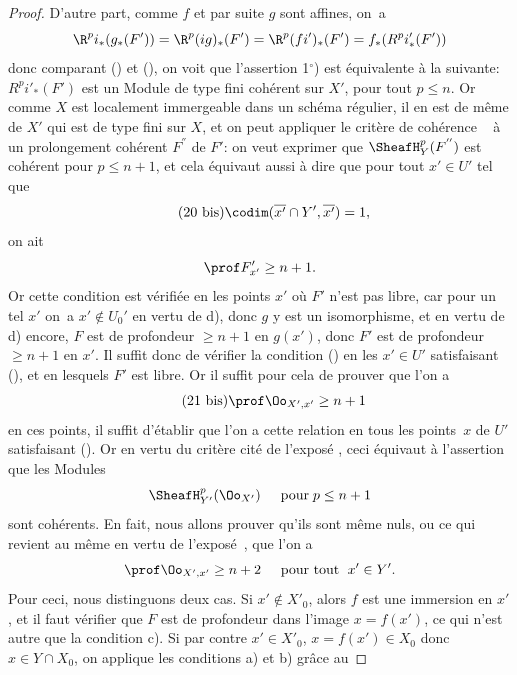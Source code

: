 \begin{proof}
D'autre part, comme $f$ et par suite $g$ sont affines, on~a
\steco
\begin{equation} \label{eq:XII.20} {}\R^pi_\ast(g_\ast(F')) = \R^p(ig)_\ast(F') = \R^p(fi')_\ast(F') = f_\ast(R^pi'_\ast(F'))
\end{equation}
donc comparant () et (), on voit que l'assertion 1${}^\circ$) est \'equivalente \`a la suivante: $R^pi'_\ast(F')$ est un Module de type fini \ie coh\'erent sur $X'$, pour tout $p\leq n$. Or comme $X$ est localement immergeable dans un sch\'ema r\'egulier, il en est de m\^eme de $X'$ qui est de type fini sur $X$, et on peut appliquer le crit\`ere de coh\'erence \ignorespaces~ \`a un prolongement coh\'erent $F^{''}$ de $F'$: on veut exprimer que $\SheafH^p_Y(F^{''})$ est coh\'erent pour $p\leq n+1$, et cela \'equivaut aussi \`a dire que pour tout $x'\in U'$ tel que
\begin{equation*} \label{eq:XII.20bis} \tag{20 bis} {}\codim (\overline{x'}\cap Y', \overline{x'})=1,
\end{equation*}
on ait
\steco
\begin{equation} \label{eq:XII.21} {} \prof F'_{x'}\geq n+1.
\end{equation}
Or cette condition est v\'erifi\'ee en les points $x'$ o\`u $F'$ n'est pas libre, car pour un tel $x'$ on~a $x'\notin U_0'$ en vertu de d), donc $g$ y est un isomorphisme, et en vertu de d) encore, $F$ est de profondeur $\geq n+1$ en $g(x')$, donc $F'$ est de profondeur $\geq n+1$ en $x'$. Il suffit donc de v\'erifier la condition () en les $x'\in U'$ satisfaisant (), et en lesquels $F'$ est libre. Or il suffit pour cela de prouver que l'on a\pageoriginale
\begin{equation*} \label{eq:XII.21bis} \tag{21 bis}
\prof \Oo_{X', x'}\geq n+1
\end{equation*}
\enlargethispage{\baselineskip}%
en ces points, \afortiori il suffit d'\'etablir que l'on a cette relation en tous les points~$x$ de $U'$ satisfaisant (). Or en vertu du crit\`ere cit\'e de l'expos\'e , ceci \'equivaut \`a l'assertion que les Modules
\[
\SheafH^p_{Y'}(\Oo_{X'}) \hspace{5mm} \text{pour} \; p\leq n+1
\]
sont coh\'erents. En fait, nous allons prouver qu'ils sont m\^eme nuls, ou ce qui revient au m\^eme en vertu de l'expos\'e~, que l'on a
\steco
\begin{equation} \label{eq:XII.22} {} \prof \Oo_{X', x'}\geq n+2 \hspace{5mm} \text{pour tout }\; x'\in Y'.
\end{equation}
Pour ceci, nous distinguons deux cas. Si $x'\notin X'_0$, alors $f$ est une immersion en $x'$, et il faut v\'erifier que $F$ est de profondeur dans l'image $x=f(x')$, ce qui n'est autre que la condition c). Si par contre $x'\in X'_0$, \ie $x=f(x')\in X_0$ donc $x\in Y\cap X_0$, on applique les conditions a) et b) gr\^ace au


\end{proof}
